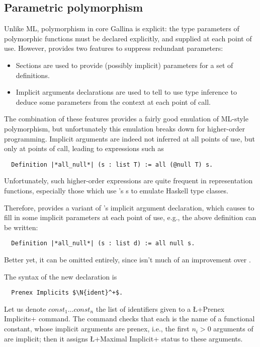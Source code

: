 \subsection{Parametric polymorphism}\label{ssec:parampoly}
Unlike ML, polymorphism in core Gallina is explicit: the type
parameters of polymorphic  functions must be declared explicitly, and
supplied at each point of use. However, \Coq{} provides two features
to suppress redundant parameters:
\begin{itemize}
\item Sections are used to provide (possibly implicit) parameters for
  a set of definitions.
\item Implicit arguments declarations are used to tell \Coq{} to use
  type inference to deduce some parameters from the context at each
  point of call.
\end{itemize}
The combination of these features provides a fairly good emulation of ML-style
polymorphism, but unfortunately this emulation breaks down for
higher-order programming. Implicit arguments are indeed not inferred
at all points of use, but only at
points of call, leading to  expressions such as
\begin{lstlisting}
  Definition |*all_null*| (s : list T) := all (@null T) s.
\end{lstlisting}
Unfortunately, such higher-order expressions are quite frequent in
representation functions, especially those which use \Coq{}'s
s to emulate Haskell type classes.

Therefore, \ssr{} provides a variant of \Coq{}'s implicit argument
declaration, which  causes \Coq{} to fill in some implicit parameters
at each point of use, e.g., the above definition can be written:
\begin{lstlisting}
  Definition |*all_null*| (s : list d) := all null s.
\end{lstlisting}
Better yet, it can be omitted entirely, since  isn't
much of an improvement over .

The syntax of the new declaration is
\begin{lstlisting}
  Prenex Implicits $\N{ident}^+$.
\end{lstlisting}
Let us denote $const_1 \dots const_n$ the list of identifiers given to a
\L+Prenex Implicits+ command.
The command checks that each   is the name of a functional
constant, whose implicit arguments are prenex, i.e., the first $n_i >
0$ arguments of  are implicit; then it assigns
\L+Maximal Implicit+ status to these arguments.

